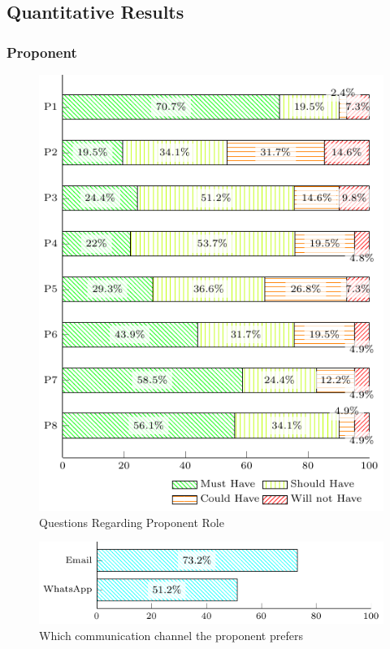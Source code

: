 \subsection{Quantitative Results}\label{sec:survey-quant}

\subsubsection{Proponent}\label{sec:survey-quant-proponent}

\begin{figure}[!htb]
  \caption{Questions Regarding Proponent Role}\label{fig:proponent-questions}
  \begin{center}
    \includegraphics[width=13cm]{img/5-questions-proponent.pdf}
  \end{center}
\end{figure}

\begin{figure}[!htb]
  \caption{Which communication channel the proponent prefers}\label{fig:outreach-roles}
  \begin{center}
    \includegraphics[width=13cm]{img/5-questions-proponent-P7-1.pdf}
  \end{center}
\end{figure}

